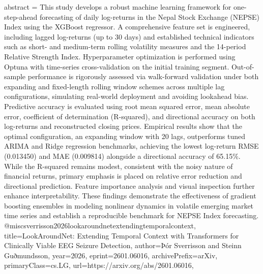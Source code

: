{      abstract = {This study develops a robust machine learning framework for one-step-ahead forecasting of daily log-returns in the Nepal Stock Exchange (NEPSE) Index using the XGBoost regressor. A comprehensive feature set is engineered, including lagged log-returns (up to 30 days) and established technical indicators such as short- and medium-term rolling volatility measures and the 14-period Relative Strength Index. Hyperparameter optimization is performed using Optuna with time-series cross-validation on the initial training segment. Out-of-sample performance is rigorously assessed via walk-forward validation under both expanding and fixed-length rolling window schemes across multiple lag configurations, simulating real-world deployment and avoiding lookahead bias. Predictive accuracy is evaluated using root mean squared error, mean absolute error, coefficient of determination (R-squared), and directional accuracy on both log-returns and reconstructed closing prices. Empirical results show that the optimal configuration, an expanding window with 20 lags, outperforms tuned ARIMA and Ridge regression benchmarks, achieving the lowest log-return RMSE (0.013450) and MAE (0.009814) alongside a directional accuracy of 65.15\%. While the R-squared remains modest, consistent with the noisy nature of financial returns, primary emphasis is placed on relative error reduction and directional prediction. Feature importance analysis and visual inspection further enhance interpretability. These findings demonstrate the effectiveness of gradient boosting ensembles in modeling nonlinear dynamics in volatile emerging market time series and establish a reproducible benchmark for NEPSE Index forecasting.}
}@misc{sverrisson2026lookaroundnetextendingtemporalcontext,
      title={LookAroundNet: Extending Temporal Context with Transformers for Clinically Viable EEG Seizure Detection}, 
      author={Þór Sverrisson and Steinn Guðmundsson},
      year={2026},
      eprint={2601.06016},
      archivePrefix={arXiv},
      primaryClass={cs.LG},
      url={https://arxiv.org/abs/2601.06016},
}
